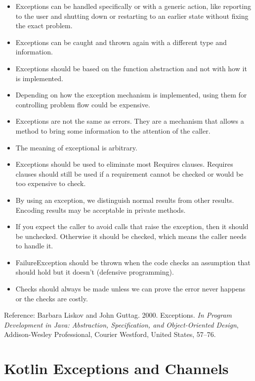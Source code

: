 \documentclass[a4paper,11pt]{article}
\theoremstyle{plain}
\theoremstyle{nonumberplain}
\begin{document}
\begin{itemize}
  \item Exceptions can be handled specifically or with a generic action, like reporting to the user and shutting down or restarting to an earlier state without fixing the exact problem.
  \item Exceptions can be caught and thrown again with a different type and information.
  \item Exceptions should be based on the function abstraction and not with how it is implemented.
  \item Depending on how the exception mechanism is implemented, using them for controlling problem flow could be expensive.
  \item Exceptions are not the same as errors. They are a mechanism that allows a method to bring some information to the attention of the caller.
  \item The meaning of exceptional is arbitrary.
  \item Exceptions should be used to eliminate most Requires clauses. Requires clauses should still be used if a requirement cannot be checked or would be too expensive to check.
  \item By using an exception, we distinguish normal results from other results. Encoding results may be acceptable in private methods.
  \item If you expect the caller to avoid calls that raise the exception, then it should be unchecked. Otherwise it should be checked, which means the caller needs to handle it.
  \item FailureException should be thrown when the code checks an assumption that should hold but it doesn't (defensive programming).
  \item Checks should always be made unless we can prove the error never happens or the checks are costly.
\end{itemize}

Reference: Barbara Liskov and John Guttag. 2000. Exceptions. \textit{In Program Development in Java: Abstraction, Specification, and Object-Oriented Design}, Addison-Wesley Professional, Courier Westford, United States, 57--76.

\section{Kotlin Exceptions and Channels}
\end{document}

